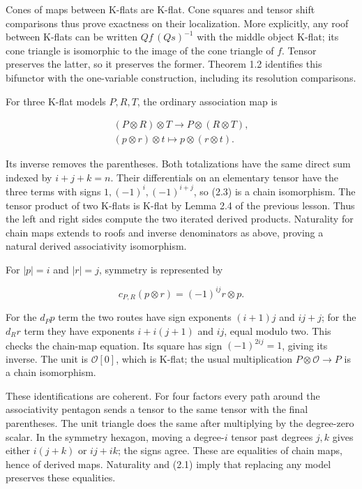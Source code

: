 \documentclass[
  english,
  11pt,
  a4paper,
]{article}
\begin{document}
Cones of maps between K-flats are K-flat. Cone squares and tensor shift
comparisons thus prove exactness on their localization. More explicitly,
any roof between K-flats can be written \(Qf\,(Qs)^{-1}\) with the
middle object K-flat; its cone triangle is isomorphic to the image of
the cone triangle of \(f\). Tensor preserves the latter, so it preserves
the former. Theorem 1.2 identifies this bifunctor with the one-variable
construction, including its resolution comparisons.

For three K-flat models \(P,R,T\), the ordinary association map is

\[\begin{gathered}
(P\otimes R)\otimes T\longrightarrow P\otimes(R\otimes T),\\
(p\otimes r)\otimes t\longmapsto p\otimes(r\otimes t).
\end{gathered}
\tag{2.3}\]

Its inverse removes the parentheses. Both totalizations have the same
direct sum indexed by \(i+j+k=n\). Their differentials on an elementary
tensor have the three terms with signs \(1,(-1)^i,(-1)^{i+j}\), so (2.3)
is a chain isomorphism. The tensor product of two K-flats is K-flat by
Lemma 2.4 of the previous lesson. Thus the left and right sides compute
the two iterated derived products. Naturality for chain maps extends to
roofs and inverse denominators as above, proving a natural derived
associativity isomorphism.

For \(|p|=i\) and \(|r|=j\), symmetry is represented by

\[c_{P,R}(p\otimes r)=(-1)^{ij}r\otimes p.
\tag{2.4}\]

For the \(d_Pp\) term the two routes have sign exponents \((i+1)j\) and
\(ij+j\); for the \(d_Rr\) term they have exponents \(i+i(j+1)\) and
\(ij\), equal modulo two. This checks the chain-map equation. Its square
has sign \((-1)^{2ij}=1\), giving its inverse. The unit is
\(\mathcal O[0]\), which is K-flat; the usual multiplication
\(P\otimes\mathcal O\to P\) is a chain isomorphism.

These identifications are coherent. For four factors every path around
the associativity pentagon sends a tensor to the same tensor with the
final parentheses. The unit triangle does the same after multiplying by
the degree-zero scalar. In the symmetry hexagon, moving a degree-\(i\)
tensor past degrees \(j,k\) gives either \(i(j+k)\) or \(ij+ik\); the
signs agree. These are equalities of chain maps, hence of derived maps.
Naturality and (2.1) imply that replacing any model preserves these
equalities.
\end{document}
